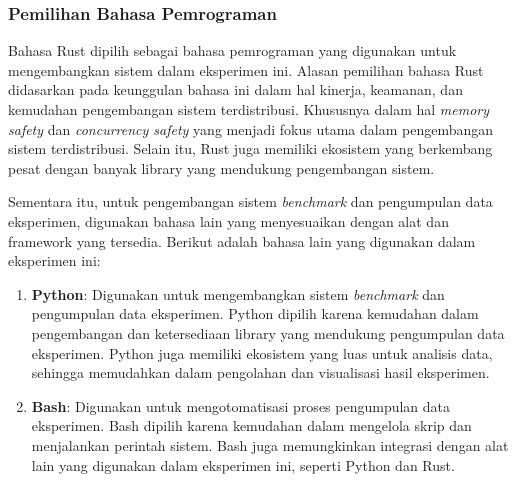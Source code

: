 \subsubsection{Pemilihan Bahasa Pemrograman}
\label{subsubsection:pilihan-bahasa-pemrograman}

Bahasa Rust dipilih sebagai bahasa pemrograman yang digunakan untuk mengembangkan sistem dalam eksperimen ini. Alasan pemilihan bahasa Rust didasarkan pada keunggulan bahasa ini dalam hal kinerja, keamanan, dan kemudahan pengembangan sistem terdistribusi. Khususnya dalam hal \textit{memory safety} dan \textit{concurrency safety} yang menjadi fokus utama dalam pengembangan sistem terdistribusi. Selain itu, Rust juga memiliki ekosistem yang berkembang pesat dengan banyak library yang mendukung pengembangan sistem.

Sementara itu, untuk pengembangan sistem \textit{benchmark} dan pengumpulan data eksperimen, digunakan bahasa lain yang menyesuaikan dengan alat dan framework yang tersedia. Berikut adalah bahasa lain yang digunakan dalam eksperimen ini:
\begin{enumerate}
	\item \textbf{Python}: Digunakan untuk mengembangkan sistem \textit{benchmark} dan pengumpulan data eksperimen. Python dipilih karena kemudahan dalam pengembangan dan ketersediaan library yang mendukung pengumpulan data eksperimen. Python juga memiliki ekosistem yang luas untuk analisis data, sehingga memudahkan dalam pengolahan dan visualisasi hasil eksperimen.
	\item \textbf{Bash}: Digunakan untuk mengotomatisasi proses pengumpulan data eksperimen. Bash dipilih karena kemudahan dalam mengelola skrip dan menjalankan perintah sistem. Bash juga memungkinkan integrasi dengan alat lain yang digunakan dalam eksperimen ini, seperti Python dan Rust.
\end{enumerate}